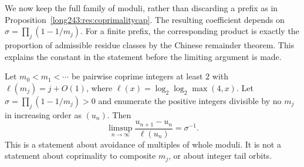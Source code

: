 \documentclass[11pt]{article}
\begin{document}
We now keep the full family of moduli, rather than discarding a prefix
as in Proposition~\ref{long243:res:coprimalitycap}. The resulting
coefficient depends on $\sigma=\prod_j(1-1/m_j)$. For a finite prefix,
the corresponding product is exactly the proportion of admissible
residue classes by the Chinese remainder theorem. This explains the
constant in the statement before the limiting argument is made.

\begin{theorem}\label{long243:res:gapconstant}
Let $m_0<m_1<\cdots$ be pairwise coprime integers at least $2$ with
$\ell(m_j)=j+O(1)$, where $\ell(x)=\log_2\log_2\max(4,x)$.
Let $\sigma=\prod_j(1-1/m_j)>0$ and enumerate the positive integers
divisible by no $m_j$ in increasing order as $(u_n)$. Then
\[
 \limsup_{n\to\infty}\frac{u_{n+1}-u_n}{\ell(u_n)}=\sigma^{-1}.
\]
This is a statement about avoidance of multiples of whole moduli. It is not a statement
about coprimality to composite $m_j$, or about integer tail orbits.
\end{theorem}
\end{document}
